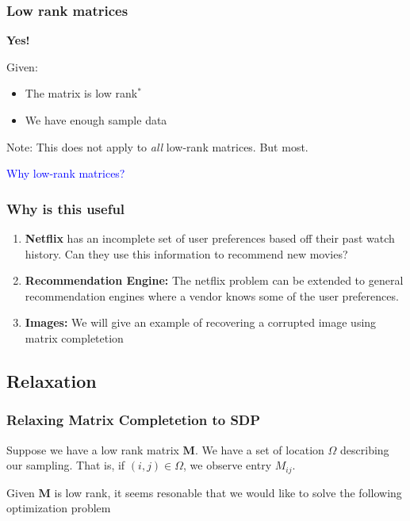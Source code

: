 \documentclass[
	11pt, %
]{beamer}
\begin{document}
\begin{frame}
	\frametitle{Low rank matrices}
	\vspace{-3em}
	\begin{center}
		{\huge \textbf{Yes!}}
	\end{center}	
	\vspace{2em}
	Given:
	\begin{itemize}
		\item The matrix is low rank$^*$
		\item We have enough sample data 
	\end{itemize}

	Note: This does not apply to \emph{all} low-rank matrices. But most.
	\vspace{1em}

	\begin{center}
		\textcolor{blue}{Why low-rank matrices?}		
	\end{center}
\end{frame}

\begin{frame}
	\frametitle{Why is this useful}
	\begin{enumerate}
		\item \textbf{Netflix} has an incomplete set of user preferences based off their past watch history. Can they use this 
		 	   information to recommend new movies?
		\item \textbf{Recommendation Engine:} The netflix problem can be extended to general recommendation engines 
		where a vendor knows some of the user preferences.
		\item \textbf{Images:} We will give an example of recovering a corrupted image using matrix completetion
	\end{enumerate}
\end{frame}


\subsection{Relaxation} 

\begin{frame}
	\frametitle{Relaxing Matrix Completetion to SDP}
	\vspace{-7em}
	Suppose we have a low rank matrix $\mathbf{M}$. We have a set of location $\Omega$ describing
	our sampling. That is, if $(i,j) \in \Omega$, we observe entry $M_{ij}$. 
	
	Given $\mathbf{M}$ is low rank, 
	it seems resonable that we would like to solve the following optimization problem
	


\end{frame}
\end{document}
